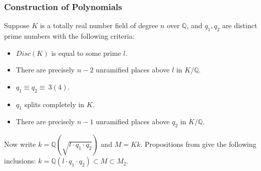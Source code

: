 \documentclass[12pt]{extarticle}
\newcommand{\Q}{\mathbb{Q}}
\newcommand{\<}{\langle}
\renewcommand{\>}{\rangle}
\theoremstyle{definition}
\begin{document}
\subsubsection*{Construction of Polynomials}
Suppose $K$ is a totally real number field of degree $n$ over $\Q$, and $q_1,q_2$ are distinct prime numbers with the following criteria:
\begin{itemize}
\item $Disc(K)$ is equal to some prime $l$.
\item There are precisely $n-2$ unramified places above $l$ in $K/\Q$. 
\item $q_1 \equiv q_2 \equiv \: 3 (4)$.
\item $q_1$ splits completely in $K$.
\item There are precisely $n-1$ unramified places above $q_2$ in $K/\Q$. 
\end{itemize}
Now write $k=\Q(\sqrt{l \cdot q_1 \cdot q_2})$ and $M=Kk$. 
Propositions from \cite{MAIR} give the following inclusions: 
$k = \Q(l \cdot q_1 \cdot q_2) \subset M \subset M_2$.
\end{document}
